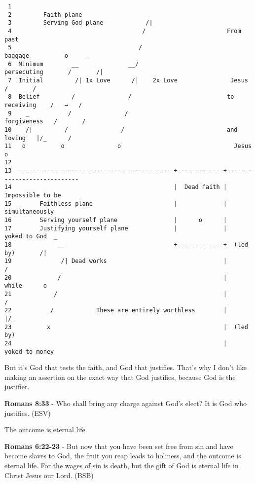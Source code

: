 \documentclass[11pt]{article}
\begin{document}
\begin{verbatim}
 1  
 2         Faith plane                 __
 3         Serving God plane            /|
 4                                     /                       From past
 5                                    /                          baggage          o     _
 6  Minimum        __              __/                         persecuting       /       /|
 7  Initial         /| 1x Love      /|    2x Love               Jesus           /       /
 8  Belief         /               /                           to receiving    /   →   /
 9    _           /               /                             forgiveness   /       /
10    /|         /               /                             and loving   |/_      /
11   o          o               o                                Jesus              o
12  
13  --------------------------------------------+-------------+----------------------------
14                                              |  Dead faith |    Impossible to be
15        Faithless plane                       |             |     simultaneously
16        Serving yourself plane                |      o      |
17        Justifying yourself plane             |             |   yoked to God  _
18             __                               +-------------+  (led by)       /|
19              /| Dead works                                 |                /
20             /                                              |    while      o
21            /                                               |              /
22           /            These are entirely worthless        |            |/_
23          x                                                 |  (led by)
24                                                            |   yoked to money
\end{verbatim}

But it's God that tests the faith, and God that justifies. That's why I don't like making an assertion on the exact way that God justifies, because God is the justifier.

\textbf{Romans 8:33} -  Who shall bring any charge against God's elect?  It is God who justifies.  (ESV)

The outcome is eternal life.

\textbf{Romans 6:22-23} - But now that you have been set free from sin and have become slaves to God, the fruit you reap leads to holiness, and the outcome is eternal life. For the wages of sin is death, but the gift of God is eternal life in Christ Jesus our Lord. (BSB)
\end{document}
